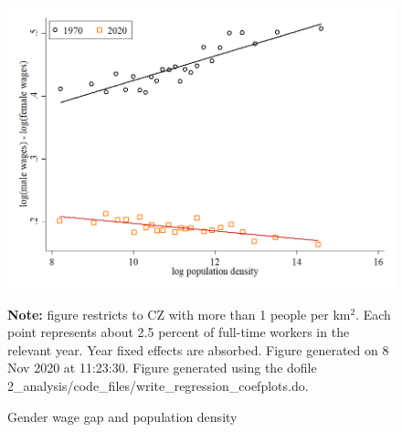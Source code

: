 \begin{figure}[!h]
\centering
\caption{Gender wage gap and population density}
\includegraphics[width=1\textwidth]{../2_analysis/output/figures/l_czone_pop_1970_vs_2020_level}
\par \begin{minipage}[h]{\textwidth}{\tiny\textbf{Note:} figure restricts to CZ with more than 1 people per km$^2$. Each point represents about 2.5 percent of full-time workers in the relevant year. Year fixed effects are absorbed. Figure generated on  8 Nov 2020 at 11:23:30. Figure generated using the dofile 2\_analysis/code\_files/write\_regression\_coefplots.do.}\end{minipage}
\end{figure}
